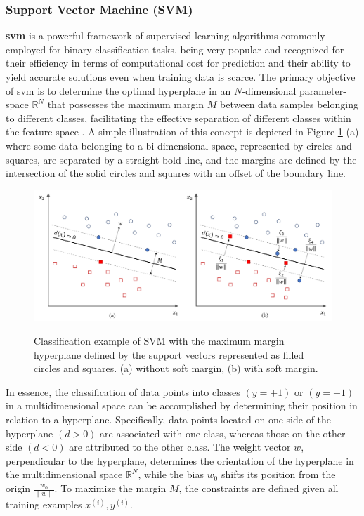 \subsubsection{Support Vector Machine (SVM)}
\label{subsubsec:machine_learning_svm}

\textbf{\gls{svm}} is a powerful framework of supervised learning algorithms commonly employed for binary classification tasks, being very popular and recognized for their efficiency in terms of computational cost for prediction and their ability to yield accurate solutions even when training data is scarce. The primary objective of \gls{svm} is to determine the optimal hyperplane in an $N$-dimensional parameter-space $\mathbb{R}^N$ that possesses the maximum margin $M$ between data samples belonging to different classes, facilitating the effective separation of different classes within the feature space \cite{Russel2010}. A simple illustration of this concept is depicted in Figure \ref{fig:frmwk_machine_learning_svm} (a) where some data belonging to a bi-dimensional space, represented by circles and squares, are separated by a straight-bold line, and the margins are defined by the intersection of the solid circles and squares with an offset of the boundary line.

\begin{figure}[htbp]
    \raggedright
        \caption{Classification example of SVM with the maximum margin hyperplane defined by the support vectors represented as filled circles and squares. (a) without soft margin, (b) with soft margin.}
        \includegraphics[width=1.0\textwidth]{resources/images/030-theoretical_framework/Framework_machine_learning_SVM.png}
        \label{fig:frmwk_machine_learning_svm}
\end{figure}

In essence, the classification of data points into classes $(y = +1)$ or $(y = -1)$ in a multidimensional space can be accomplished by determining their position in relation to a hyperplane. Specifically, data points located on one side of the hyperplane $(d > 0)$ are associated with one class, whereas those on the other side $(d < 0)$ are attributed to the other class. The weight vector $w$, perpendicular to the hyperplane, determines the orientation of the hyperplane in the multidimensional space $\mathbb{R}^N$, while the bias $w_0$ shifts its position from the origin $\frac{w_0}{\parallel w \parallel}$. To maximize the margin $M$, the constraints are defined given all training examples {$x^{(i)}, y^{(i)}$}.

